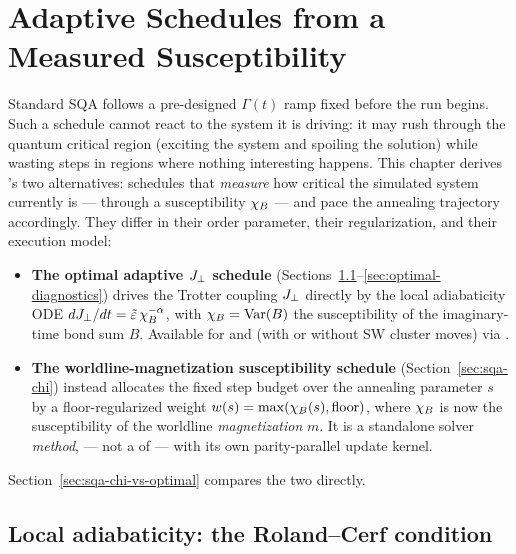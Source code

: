 \chapter{Adaptive Schedules from a Measured Susceptibility}
\label{ch:optimal}

Standard SQA follows a pre-designed $\Gamma(t)$ ramp fixed before the run
begins. Such a schedule cannot react to the system it is driving: it may
rush through the quantum critical region (exciting the system and spoiling
the solution) while wasting steps in regions where nothing interesting
happens. This chapter derives \qv's two alternatives: schedules that
\emph{measure} how critical the simulated system currently is --- through a
susceptibility $\chi_B$ --- and pace the annealing trajectory accordingly.
They differ in their order parameter, their regularization, and their
execution model:

\begin{itemize}
\item \textbf{The optimal adaptive $J_{\perp}$ schedule}
(Sections~\ref{sec:roland-cerf}--\ref{sec:optimal-diagnostics}) drives the
Trotter coupling $J_{\perp}$ directly by the local adiabaticity ODE
$dJ_{\perp}/dt=\tilde{\varepsilon}\,\chi_B^{-\alpha}$, with $\chi_B=\operatorname{Var}(B)$ the
susceptibility of the imaginary-time bond sum $B$. Available for 
and 
(with or without SW cluster moves) via .
\item \textbf{The worldline-magnetization susceptibility schedule}
(Section~\ref{sec:sqa-chi}) instead allocates the fixed step budget over
the annealing parameter $s$ by a floor-regularized weight
$w(s)=\max(\chi_B(s),\text{floor})$, where $\chi_B$ is now the susceptibility
of the worldline \emph{magnetization} $m$. It is a standalone solver
\emph{method},  --- not a  of
 --- with its own parity-parallel update kernel.
\end{itemize}

Section~\ref{sec:sqa-chi-vs-optimal} compares the two directly.

\section{Local adiabaticity: the Roland--Cerf condition}
\label{sec:roland-cerf}

